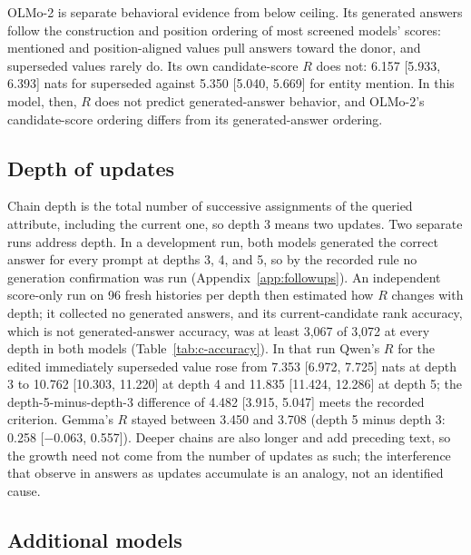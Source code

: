 OLMo-2 is separate behavioral evidence from below ceiling. Its generated answers follow the construction and position ordering of most screened models' scores: mentioned and position-aligned values pull answers toward the donor, and superseded values rarely do. Its own candidate-score $R$ does not: 6.157 [5.933, 6.393] nats for superseded against 5.350 [5.040, 5.669] for entity mention. In this model, then, $R$ does not predict generated-answer behavior, and OLMo-2's candidate-score ordering differs from its generated-answer ordering.

\subsection{Depth of updates}
\label{sec:depth}

Chain depth is the total number of successive assignments of the queried attribute, including the current one, so depth 3 means two updates. Two separate runs address depth. In a development run, both models generated the correct answer for every prompt at depths 3, 4, and 5, so by the recorded rule no generation confirmation was run (Appendix~\ref{app:followups}). An independent score-only run on 96 fresh histories per depth then estimated how $R$ changes with depth; it collected no generated answers, and its current-candidate rank accuracy, which is not generated-answer accuracy, was at least 3,067 of 3,072 at every depth in both models (Table~\ref{tab:c-accuracy}). In that run Qwen's $R$ for the edited immediately superseded value rose from 7.353 [6.972, 7.725] nats at depth 3 to 10.762 [10.303, 11.220] at depth 4 and 11.835 [11.424, 12.286] at depth 5; the depth-5-minus-depth-3 difference of 4.482 [3.915, 5.047] meets the recorded criterion. Gemma's $R$ stayed between 3.450 and 3.708 (depth 5 minus depth 3: 0.258 [−0.063, 0.557]). Deeper chains are also longer and add preceding text, so the growth need not come from the number of updates as such; the interference that \citet{wang2025unable} observe in answers as updates accumulate is an analogy, not an identified cause.

\subsection{Additional models}
\label{sec:additional-models}

